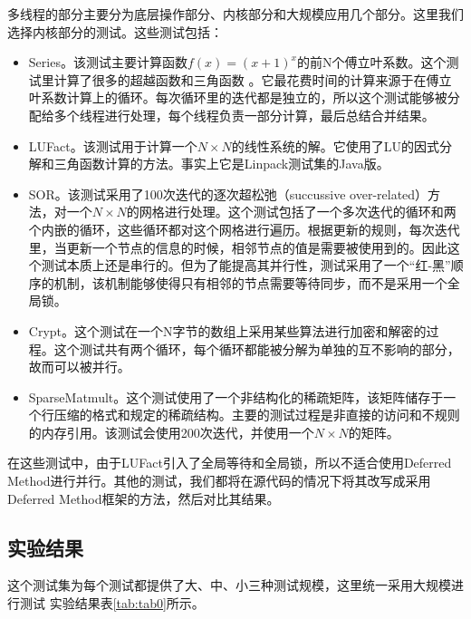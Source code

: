 多线程的部分主要分为底层操作部分、内核部分和大规模应用几个部分。这里我们选择内核部分的测试。这些测试包括：

\begin{itemize}
	\item Series。该测试主要计算函数$f(x) = (x + 1)^x$的前N个傅立叶系数。这个测试里计算了很多的超越函数和三角函数 。它最花费时间的计算来源于在傅立叶系数计算上的循环。每次循环里的迭代都是独立的，所以这个测试能够被分配给多个线程进行处理，每个线程负责一部分计算，最后总结合并结果。
	\item LUFact。该测试用于计算一个$N \times N$的线性系统的解。它使用了LU的因式分解和三角函数计算的方法。事实上它是Linpack测试集的Java版。
	\item SOR。该测试采用了100次迭代的逐次超松弛（succussive over-related）方法，对一个$N \times N$的网格进行处理。这个测试包括了一个多次迭代的循环和两个内嵌的循环，这些循环都对这个网格进行遍历。根据更新的规则，每次迭代里，当更新一个节点的信息的时候，相邻节点的值是需要被使用到的。因此这个测试本质上还是串行的。但为了能提高其并行性，测试采用了一个“红-黑”顺序的机制，该机制能够使得只有相邻的节点需要等待同步，而不是采用一个全局锁。
	\item Crypt。这个测试在一个N字节的数组上采用某些算法进行加密和解密的过程。这个测试共有两个循环，每个循环都能被分解为单独的互不影响的部分，故而可以被并行。
	\item SparseMatmult。这个测试使用了一个非结构化的稀疏矩阵，该矩阵储存于一个行压缩的格式和规定的稀疏结构。主要的测试过程是非直接的访问和不规则的内存引用。该测试会使用200次迭代，并使用一个$N \times N$的矩阵。
\end{itemize}

在这些测试中，由于LUFact引入了全局等待和全局锁，所以不适合使用Deferred Method进行并行。其他的测试，我们都将在源代码的情况下将其改写成采用Deferred Method框架的方法，然后对比其结果。

\subsection{实验结果}

这个测试集为每个测试都提供了大、中、小三种测试规模，这里统一采用大规模进行测试
实验结果表\ref{tab:tab0}所示。

